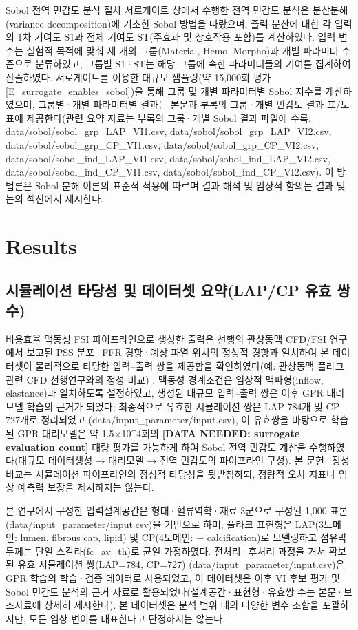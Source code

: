 \documentclass[preprint,12pt]{elsarticle}
\begin{document}
Sobol 전역 민감도 분석 절차
서로게이트 상에서 수행한 전역 민감도 분석은 분산분해(variance decomposition)에 기초한 Sobol 방법을 따랐으며, 출력 분산에 대한 각 입력의 1차 기여도 S1과 전체 기여도 ST(주효과 및 상호작용 포함)를 계산하였다. 입력 변수는 실험적 목적에 맞춰 세 개의 그룹(Material, Hemo, Morpho)과 개별 파라미터 수준으로 분류하였고, 그룹별 S1·ST는 해당 그룹에 속한 파라미터들의 기여를 집계하여 산출하였다. 서로게이트를 이용한 대규모 샘플링(약 15,000회 평가 [E\_surrogate\_enables\_sobol])을 통해 그룹 및 개별 파라미터별 Sobol 지수를 계산하였으며, 그룹별·개별 파라미터별 결과는 본문과 부록의 그룹·개별 민감도 결과 표/도표에 제공한다(관련 요약 자료는 부록의 그룹·개별 Sobol 결과 파일에 수록: data/sobol/sobol\_grp\_LAP\_VI1.csv, data/sobol/sobol\_grp\_LAP\_VI2.csv, data/sobol/sobol\_grp\_CP\_VI1.csv, data/sobol/sobol\_grp\_CP\_VI2.csv, data/sobol/sobol\_ind\_LAP\_VI1.csv, data/sobol/sobol\_ind\_LAP\_VI2.csv, data/sobol/sobol\_ind\_CP\_VI1.csv, data/sobol/sobol\_ind\_CP\_VI2.csv). 이 방법론은 Sobol 분해 이론의 표준적 적용에 따르며 결과 해석 및 임상적 함의는 결과 및 논의 섹션에서 제시한다.

\section{Results}

\subsection{시뮬레이션 타당성 및 데이터셋 요약(LAP/CP 유효 쌍 수)}
비용효율 맥동성 FSI 파이프라인으로 생성한 출력은 선행의 관상동맥 CFD/FSI 연구에서 보고된 PSS 분포·FFR 경향·예상 파열 위치의 정성적 경향과 일치하여 본 데이터셋이 물리적으로 타당한 입력–출력 쌍을 제공함을 확인하였다(예: 관상동맥 플라크 관련 CFD 선행연구와의 정성 비교) \cite{chaichana2012}. 맥동성 경계조건은 임상적 맥파형(inflow, elastance)과 일치하도록 설정하였고, 생성된 대규모 입력–출력 쌍은 이후 GPR 대리모델 학습의 근거가 되었다; 최종적으로 유효한 시뮬레이션 쌍은 LAP 784개 및 CP 727개로 정리되었고 (data/input\_parameter/input.csv), 이 유효쌍을 바탕으로 학습된 GPR 대리모델은 약 1.5×10\textasciicircum 4회의 \textbf{[DATA NEEDED: surrogate evaluation count]} 대량 평가를 가능하게 하여 Sobol 전역 민감도 계산을 수행하였다(대규모 데이터생성 → 대리모델 → 전역 민감도의 파이프라인 구성). 본 문헌·정성 비교는 시뮬레이션 파이프라인의 정성적 타당성을 뒷받침하되, 정량적 오차 지표나 임상 예측력 보장을 제시하지는 않는다.

본 연구에서 구성한 입력설계공간은 형태·혈류역학·재료 3군으로 구성된 1,000 표본(data/input\_parameter/input.csv)을 기반으로 하며, 플라크 표현형은 LAP(3도메인: lumen, fibrous cap, lipid) 및 CP(4도메인: + calcification)로 모델링하고 섬유막 두께는 단일 스칼라(fc\_av\_th)로 균일 가정하였다. 전처리·후처리 과정을 거쳐 확보된 유효 시뮬레이션 쌍(LAP=784, CP=727) (data/input\_parameter/input.csv)은 GPR 학습의 학습·검증 데이터로 사용되었고, 이 데이터셋은 이후 VI 후보 평가 및 Sobol 민감도 분석의 근거 자료로 활용되었다(설계공간·표현형·유효쌍 수는 본문·보조자료에 상세히 제시한다). 본 데이터셋은 분석 범위 내의 다양한 변수 조합을 포괄하지만, 모든 임상 변이를 대표한다고 단정하지는 않는다.
\end{document}
